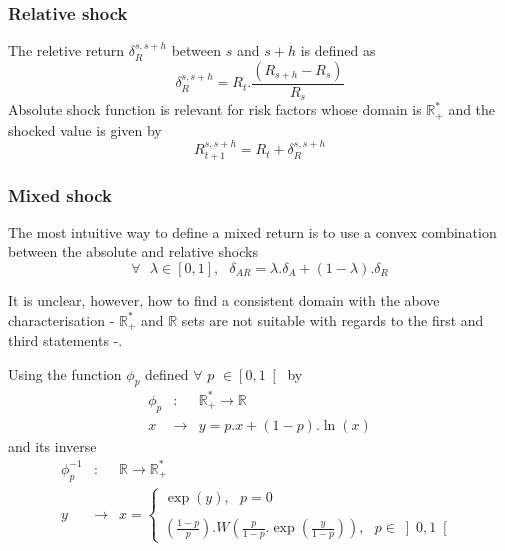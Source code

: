 \documentclass[10pt,a4paper]{report}
\begin{document}
\subsubsection{Relative shock}

The reletive return $\delta _{R}^{s,s+h}$ between $s$ and $s+h$ is defined as%
\begin{equation*}
\delta _{R}^{s,s+h}=R_{t}.\frac{\left( R_{s+h}-R_{s}\right) }{R_{s}}
\end{equation*}%
Absolute shock function is relevant for risk factors whose domain is $%
\mathbb{R}_{+}^{\ast }$ and the shocked value is given by 
\begin{equation*}
R_{t+1}^{s,s+h}=R_{t}+\delta _{R}^{s,s+h}
\end{equation*}

\subsubsection{Mixed shock}

The most intuitive way to define a mixed return is to use a convex
combination between the absolute and relative shocks 
\begin{equation*}
\forall \text{ }\lambda \in \left[ 0,1\right] ,\text{ \ \ }\delta
_{AR}=\lambda .\delta _{A}+(1-\lambda ).\delta _{R}
\end{equation*}

It is unclear, however, how to find a consistent domain with the above
characterisation - $\mathbb{R}_{+}^{\ast }$ and $\mathbb{R}$ sets are not
suitable with regards to the first and third statements -.\\ 

\bigskip


Using the function $\phi _{p}$ defined $\forall $ $p$ $\in \left[ 0,1\right[ 
$ by%
\begin{eqnarray*}
\phi _{p} &:&\mathbb{R}_{+}^{\ast }\rightarrow \mathbb{R} \\
x &\rightarrow &y=p.x+(1-p).\ln (x)
\end{eqnarray*}%
and its inverse 
\begin{eqnarray*}
\phi _{p}^{-1} &:&\mathbb{R}\rightarrow \mathbb{R}_{+}^{\ast } \\
y &\rightarrow &x=\left\{ 
\begin{array}{c}
\exp (y),\text{ \ \ \ \ \ \ \ \ \ \ \ \ \ \ \ \ \ \ \ \ \ \ \ \ \ }p=0 \\ 
\\ 
\left( \frac{1-p}{p}\right) .W\left( \frac{p}{1-p}.\exp \left( \frac{y}{1-p}%
\right) \right) ,\text{ }p\in \left] 0,1\right[ 
\end{array}%
\right. 
\end{eqnarray*}
\end{document}
